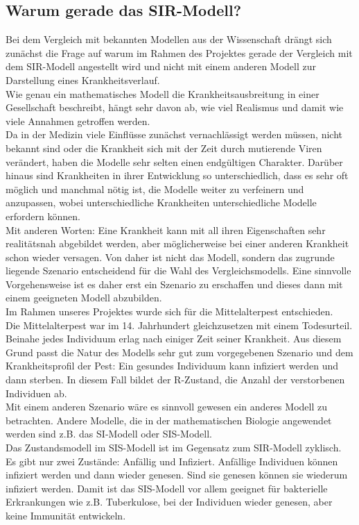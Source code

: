 \subsection*{Warum gerade das SIR-Modell?}
Bei dem Vergleich mit bekannten Modellen aus der Wissenschaft drängt sich zunächst die Frage auf warum im Rahmen des Projektes gerade der Vergleich mit dem SIR-Modell angestellt wird und nicht mit einem anderen Modell zur Darstellung eines Krankheitsverlauf.\\
Wie genau ein mathematisches Modell die Krankheitsausbreitung in einer Gesellschaft beschreibt, hängt sehr davon ab, wie viel Realismus und damit wie viele Annahmen getroffen werden.\\
Da in der Medizin viele Einflüsse zunächst vernachlässigt werden müssen, nicht bekannt sind oder die Krankheit sich mit der Zeit durch mutierende Viren verändert, haben die Modelle sehr selten einen endgültigen Charakter. Darüber hinaus sind Krankheiten in ihrer Entwicklung so unterschiedlich, dass es sehr oft möglich und manchmal nötig ist, die Modelle weiter zu verfeinern und anzupassen, wobei unterschiedliche Krankheiten unterschiedliche Modelle erfordern können. 
\cite{sebM}\\
Mit anderen Worten: Eine Krankheit kann mit all ihren Eigenschaften sehr realitätsnah abgebildet werden, aber möglicherweise bei einer anderen Krankheit schon wieder versagen. Von daher ist nicht das Modell, sondern das zugrunde liegende Szenario entscheidend für die Wahl des Vergleichsmodells. Eine sinnvolle Vorgehensweise ist es daher erst ein Szenario zu erschaffen und dieses dann mit einem geeigneten Modell abzubilden.\\ 
Im Rahmen unseres Projektes wurde sich für die Mittelalterpest entschieden.\\ 
Die Mittelalterpest war im 14. Jahrhundert gleichzusetzen mit einem Todesurteil. Beinahe jedes Individuum erlag nach einiger Zeit seiner Krankheit. Aus diesem Grund passt die Natur des Modells sehr gut zum vorgegebenen Szenario und dem Krankheitsprofil der Pest: Ein gesundes Individuum kann infiziert werden und dann sterben. In diesem Fall bildet der \glqq R\grqq-Zustand, die Anzahl der verstorbenen Individuen ab.\\
Mit einem anderen Szenario wäre es sinnvoll gewesen ein anderes Modell zu betrachten. 
Andere Modelle, die in der mathematischen Biologie angewendet werden sind z.B. das SI-Modell oder SIS-Modell.\\
Das Zustandsmodell im SIS-Modell ist im Gegensatz zum SIR-Modell zyklisch. Es gibt nur zwei Zustände: Anfällig und Infiziert. Anfällige Individuen können infiziert werden und dann wieder genesen. Sind sie genesen können sie wiederum infiziert werden. Damit ist das SIS-Modell vor allem geeignet für bakterielle Erkrankungen wie z.B. Tuberkulose, bei der Individuen wieder genesen, aber keine Immunität entwickeln. \\
